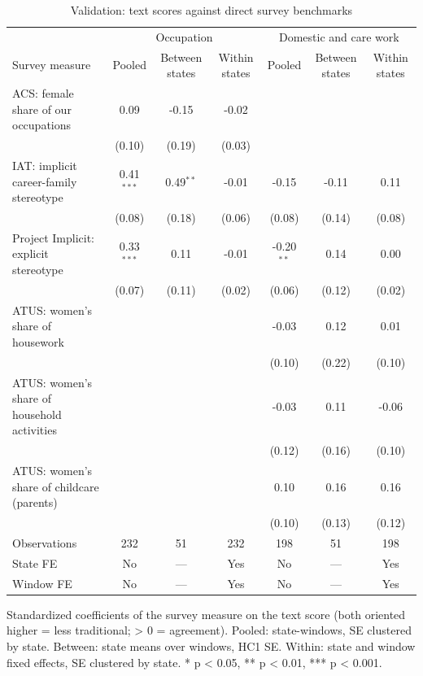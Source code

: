 \begin{table}[ht]\centering\small
\caption{Validation: text scores against direct survey benchmarks}
\begin{tabular}{lcccccc}
\toprule
 & \multicolumn{3}{c}{Occupation} & \multicolumn{3}{c}{Domestic and care work} \\
Survey measure & Pooled & Between states & Within states & Pooled & Between states & Within states \\
\midrule
ACS: female share of our occupations & 0.09 & -0.15 & -0.02 &  &  &  \\
 & (0.10) & (0.19) & (0.03) &  &  &  \\
IAT: implicit career-family stereotype & 0.41$^{***}$ & 0.49$^{**}$ & -0.01 & -0.15 & -0.11 & 0.11 \\
 & (0.08) & (0.18) & (0.06) & (0.08) & (0.14) & (0.08) \\
Project Implicit: explicit stereotype & 0.33$^{***}$ & 0.11 & -0.01 & -0.20$^{**}$ & 0.14 & 0.00 \\
 & (0.07) & (0.11) & (0.02) & (0.06) & (0.12) & (0.02) \\
ATUS: women's share of housework &  &  &  & -0.03 & 0.12 & 0.01 \\
 &  &  &  & (0.10) & (0.22) & (0.10) \\
ATUS: women's share of household activities &  &  &  & -0.03 & 0.11 & -0.06 \\
 &  &  &  & (0.12) & (0.16) & (0.10) \\
ATUS: women's share of childcare (parents) &  &  &  & 0.10 & 0.16 & 0.16 \\
 &  &  &  & (0.10) & (0.13) & (0.12) \\
\midrule
Observations & 232 & 51 & 232 & 198 & 51 & 198 \\
State FE & No & — & Yes & No & — & Yes \\
Window FE & No & — & Yes & No & — & Yes \\
\bottomrule
\end{tabular}
\par\footnotesize Standardized coefficients of the survey measure on the text score (both oriented higher = less traditional; > 0 = agreement). Pooled: state-windows, SE clustered by state. Between: state means over windows, HC1 SE. Within: state and window fixed effects, SE clustered by state. * p < 0.05, ** p < 0.01, *** p < 0.001.
\end{table}